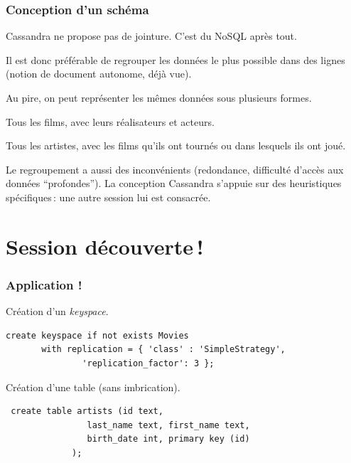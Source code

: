 \begin{frame}
\frametitle{Conception d'un schéma}

\alert{Cassandra ne propose pas de jointure}. C'est du NoSQL après tout.

\vfill

Il est donc préférable de \alert{regrouper} les données le plus possible dans des lignes
(notion de document autonome, déjà vue).

\vfill


Au pire, on peut représenter les mêmes données sous plusieurs formes.

\begin{redbullet}
  \item Tous les films, avec leurs réalisateurs et acteurs.
  \item Tous les artistes, avec les films qu'ils ont tournés ou dans lesquels ils ont joué.
\end{redbullet}


\vfill

Le regroupement a aussi des inconvénients (redondance, difficulté d'accès aux
données ``profondes''). 
La conception Cassandra s'appuie sur des heuristiques
spécifiques\,: une autre session lui est consacrée.
\end{frame}

\section{Session découverte\,!}


\begin{frame}[fragile]
\frametitle{Application !}

Création d'un \textit{keyspace}.

\begin{verbatim}
create keyspace if not exists Movies 
       with replication = { 'class' : 'SimpleStrategy',
               'replication_factor': 3 };
\end{verbatim}

\vfill

Création d'une table (sans imbrication).


\begin{verbatim}
 create table artists (id text, 
                last_name text, first_name text, 
                birth_date int, primary key (id) 
             );
\end{verbatim}
\end{frame}


